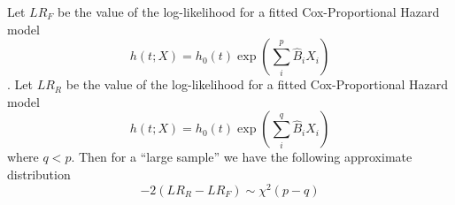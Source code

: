 \documentclass{beamer}
\theoremstyle{definition}
\begin{document}
\begin{frame} 
 Let $LR_F$ be the value of the log-likelihood for a fitted Cox-Proportional Hazard model
\[ h(t;X) = h_0(t) \exp(\sum_i^p \hat{B}_iX_i) \].
Let $LR_R$ be the value of the log-likelihood for a fitted Cox-Proportional Hazard model
\[ h(t;X) = h_0(t) \exp(\sum_i^q \hat{B}_iX_i) \]
where $q<p$.
Then for a ``large sample'' we have the following approximate distribution
\[
-2(LR_R - LR_F) \sim \chi^2(p-q)
\]
\end{frame} 
%
\end{document}

